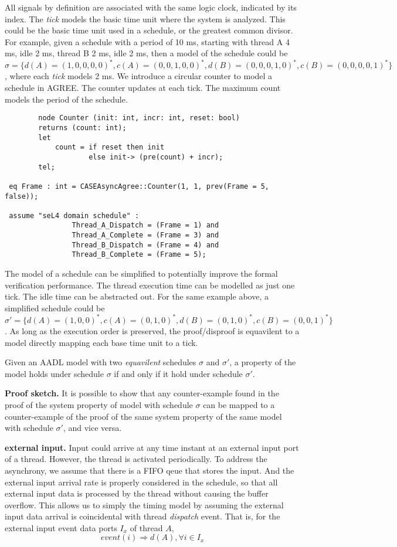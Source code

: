 All signals by definition are associated with the same logic clock, indicated by its index. The \emph{tick} models the basic time unit where the system is analyzed. This could be the basic time unit used in a schedule, or the greatest common divisor. For example, given a schedule with a period of 10 ms, starting with thread A 4 ms, idle 2 ms, thread B 2 ms, idle 2 ms, then a model of the schedule could be $\sigma = \{d(A)=(1,0,0,0,0)^*, c(A) = (0,0,1,0,0)^*, d(B) = (0,0,0,1,0)^*, c(B) = (0,0,0,0,1)^*\}$, where each \emph{tick} models 2 ms. We introduce a circular counter to model a schedule in AGREE. The counter updates at each tick. The maximum count models the period of the schedule. 
\begin{verbatim}
		node Counter (init: int, incr: int, reset: bool)	
		returns (count: int);
		let
			count = if reset then init
					else init-> (pre(count) + incr);
		tel;
		
 eq Frame : int = CASEAsyncAgree::Counter(1, 1, prev(Frame = 5, false));

 assume "seL4 domain schedule" :
				Thread_A_Dispatch = (Frame = 1) and
				Thread_A_Complete = (Frame = 3) and					
				Thread_B_Dispatch = (Frame = 4) and	
				Thread_B_Complete = (Frame = 5);	
\end{verbatim}		

The model of a schedule can be simplified to potentially improve the formal verification performance. The thread execution time can be modelled as just one tick. The idle time can be abstracted out. For the same example above, a simplified schedule could be  $\sigma' = \{d(A)=(1,0,0)^*, c(A) = (0,1,0)^*, d(B) = (0,1,0)^*, c(B) = (0,0,1)^*\}$. As long as the execution order is preserved, the proof/disproof is equavilent to a model directly mapping each base time unit to a tick. 
	
\begin{theorem}
Given an AADL model with two \emph{equavilent} schedules $\sigma$ and $\sigma'$, a property of the model holds under schedule $\sigma$ if and only if it hold under schedule $\sigma'$.
\end{theorem}

{\bf Proof sketch.} 
It is possible to show that any counter-example found in the proof of the system property of model with schedule $\sigma$ can be mapped to a counter-example of the proof of the same system property of the same model with schedule $\sigma'$,  and vice versa. 

{\bf external input.} 
Input could arrive at any time instant at an external input port of a thread. However, the thread is activated periodically. To address the asynchrony, we assume that there is a FIFO qeue that stores the input. And the external input arrival rate is properly considered in the schedule, so that all external input data is processed by the thread without causing the buffer overflow. This allows us to simply the timing model by assuming the external input data arrival is coincidental with thread \emph{dispatch} event. That is, for the external input event data ports $I_x$ of thread $A$, 
$$ event(i) \Rightarrow d(A), \forall i \in I_x $$

